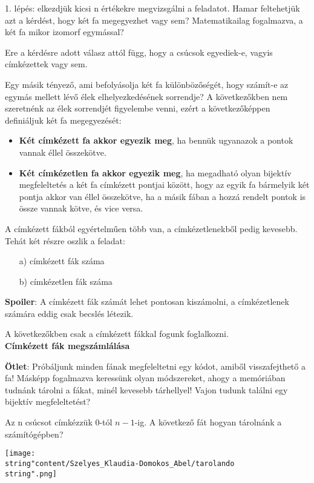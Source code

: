 \begin{solution}
	1. lépés: elkezdjük kicsi n értékekre megvizsgálni a feladatot. Hamar
	feltehetjük azt a kérdést, hogy két fa megegyezhet vagy sem? Matematikailag
	fogalmazva, a két fa mikor izomorf egymással?
	
	Ere a kérdésre adott válasz attól függ, hogy a csúcsok egyediek-e,
	vagyis címkézettek vagy sem.
	
	Egy másik tényező, ami befolyásolja két fa különbözőségét, hogy számít-e
	az egymás mellett lévő élek elhelyezkedésének sorrendje? A következőkben
	nem szeretnénk az élek sorrendjét figyelembe venni, ezért a következőképpen
	definiáljuk két fa megegyezését: 

\begin{itemize}
	\item \textbf{Két címkézett fa akkor egyezik meg}, ha bennük ugyanazok a
	pontok vannak éllel összekötve. 
	\item \textbf{Két címkézetlen fa akkor egyezik meg}, ha megadható olyan
	bijektív megfeleltetés a két fa címkézett pontjai között, hogy az
	egyik fa bármelyik két pontja akkor van éllel összekötve, ha a másik
	fában a hozzá rendelt pontok is össze vannak kötve, és vice versa. 
\end{itemize}
A címkézett fákból egyértelműen több van, a címkézetlenekből pedig
kevesebb. Tehát két részre oszlik a feladat: 
\begin{itemize}
	\item[a)] címkézett fák száma 
	\item[b)] címkézetlen fák száma 
\end{itemize}
\textbf{Spoiler}: A címkézett fák számát lehet pontosan kiszámolni,
a címkézetlenek számára eddig csak becslés létezik.

A következőkben csak a címkézett fákkal fogunk foglalkozni.\\

\textbf{Címkézett fák megszámlálása}

\textbf{Ötlet}: Próbáljunk minden fának megfeleltetni egy kódot, amiből
visszafejthető a fa! Másképp fogalmazva keressünk olyan módszereket,
ahogy a memóriában tudnánk tárolni a fákat, minél kevesebb tárhellyel!
Vajon tudunk találni egy bijektív megfeleltetést?

Az n csúcsot címkézzük 0-tól $n-1$-ig. A következő fát hogyan tárolnánk
a számítógépben?
\begin{center}
	\texttt{[image: \\string"content/Szelyes\_Klaudia-Domokos\_Abel/tarolando\\string".png]} 
	\par\end{center}


\end{solution}
